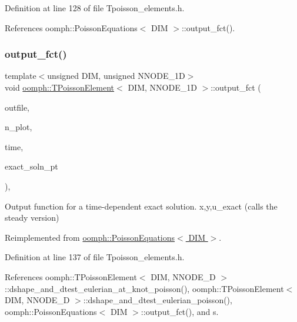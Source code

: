 Definition at line 128 of file Tpoisson\+\_\+elements.\+h.



References oomph\+::\+Poisson\+Equations$<$ D\+I\+M $>$\+::output\+\_\+fct().

\mbox{\label{classoomph_1_1TPoissonElement_a06d4e2f4c6bf67caf316af96e85b61d8}} 
\subsubsection{\texorpdfstring{output\+\_\+fct()}{output\_fct()}\hspace{0.1cm}{\footnotesize\ttfamily [2/2]}}
{\footnotesize\ttfamily template$<$unsigned D\+IM, unsigned N\+N\+O\+D\+E\+\_\+1D$>$ \\
void \hyperlink{classoomph_1_1TPoissonElement}{oomph\+::\+T\+Poisson\+Element}$<$ D\+IM, N\+N\+O\+D\+E\+\_\+1D $>$\+::output\+\_\+fct (\begin{DoxyParamCaption}\item[{std\+::ostream \&}]{outfile,  }\item[{const unsigned \&}]{n\+\_\+plot,  }\item[{const double \&}]{time,  }\item[{\hyperlink{classoomph_1_1FiniteElement_ad4ecf2b61b158a4b4d351a60d23c633e}{Finite\+Element\+::\+Unsteady\+Exact\+Solution\+Fct\+Pt}}]{exact\+\_\+soln\+\_\+pt }\end{DoxyParamCaption})\hspace{0.3cm}{\ttfamily [inline]}, {\ttfamily [virtual]}}



Output function for a time-\/dependent exact solution. x,y,u\+\_\+exact (calls the steady version) 



Reimplemented from \hyperlink{classoomph_1_1PoissonEquations_a6d98964a14b38f4b2e89a2744478f706}{oomph\+::\+Poisson\+Equations$<$ D\+I\+M $>$}.



Definition at line 137 of file Tpoisson\+\_\+elements.\+h.



References oomph\+::\+T\+Poisson\+Element$<$ D\+I\+M, N\+N\+O\+D\+E\+\_\+D $>$\+::dshape\+\_\+and\+\_\+dtest\+\_\+eulerian\+\_\+at\+\_\+knot\+\_\+poisson(), oomph\+::\+T\+Poisson\+Element$<$ D\+I\+M, N\+N\+O\+D\+E\+\_\+D $>$\+::dshape\+\_\+and\+\_\+dtest\+\_\+eulerian\+\_\+poisson(), oomph\+::\+Poisson\+Equations$<$ D\+I\+M $>$\+::output\+\_\+fct(), and s.

